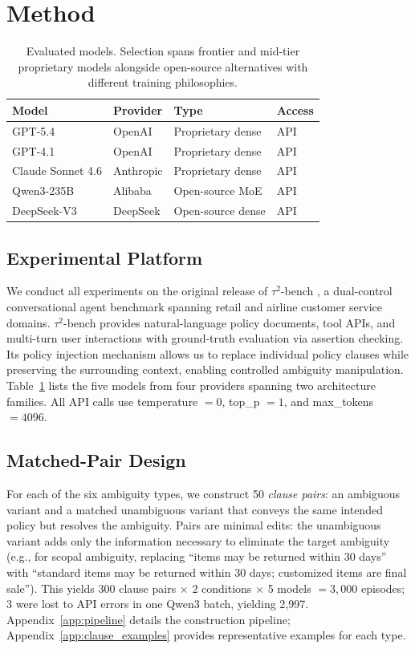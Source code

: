 \section{Method}
\label{sec:method}

\begin{table}[t]
\centering
\footnotesize
\caption{Evaluated models. Selection spans frontier and mid-tier proprietary models alongside open-source alternatives with different training philosophies.}
\label{tab:models}
\setlength{\tabcolsep}{4pt}
\begin{tabular}{@{}llll@{}}
\toprule
\textbf{Model} & \textbf{Provider} & \textbf{Type} & \textbf{Access} \\
\midrule
GPT-5.4 & OpenAI & Proprietary dense & API \\
GPT-4.1 & OpenAI & Proprietary dense & API \\
Claude Sonnet 4.6 & Anthropic & Proprietary dense & API \\
Qwen3-235B & Alibaba & Open-source MoE & API \\
DeepSeek-V3 & DeepSeek & Open-source dense & API \\
\bottomrule
\end{tabular}
\end{table}

\subsection{Experimental Platform}

We conduct all experiments on the original release of $\tau^2$-bench \citep{tau2_bench_2025}, a dual-control conversational agent benchmark spanning retail and airline customer service domains. $\tau^2$-bench provides natural-language policy documents, tool APIs, and multi-turn user interactions with ground-truth evaluation via assertion checking. Its policy injection mechanism allows us to replace individual policy clauses while preserving the surrounding context, enabling controlled ambiguity manipulation. Table~\ref{tab:models} lists the five models from four providers spanning two architecture families. All API calls use temperature $= 0$, top\_p $= 1$, and max\_tokens $= 4096$.

\subsection{Matched-Pair Design}

For each of the six ambiguity types, we construct 50 \emph{clause pairs}: an ambiguous variant and a matched unambiguous variant that conveys the same intended policy but resolves the ambiguity. Pairs are minimal edits: the unambiguous variant adds only the information necessary to eliminate the target ambiguity (e.g., for scopal ambiguity, replacing ``items may be returned within 30 days'' with ``standard items may be returned within 30 days; customized items are final sale''). This yields 300 clause pairs $\times$ 2 conditions $\times$ 5 models $= 3{,}000$ episodes; 3 were lost to API errors in one Qwen3 batch, yielding 2{,}997. Appendix~\ref{app:pipeline} details the construction pipeline; Appendix~\ref{app:clause_examples} provides representative examples for each type.

